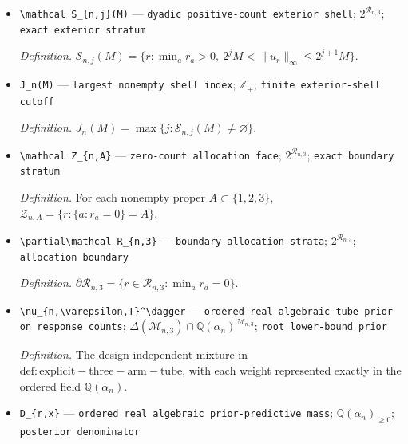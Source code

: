 \documentclass{article}
\begin{document}
\begin{itemize}
  \par\smallskip\noindent\emph{Definition.} \(\mathcal F_n(M)=\{r\in\mathcal R_{n,3}:\|u_r\|_\infty\le M\}\).
  \item \texttt{\textbackslash{}\allowbreak{}mathcal S\_\allowbreak{}\{n,\allowbreak{}j\}\allowbreak{}(M)} --- \texttt{dyadic positive-\allowbreak{}count exterior shell}; \(2^{\mathcal R_{n,3}}\); \texttt{exact exterior stratum}
  \par\smallskip\noindent\emph{Definition.} \(\mathcal S_{n,j}(M)=\{r:\min_ar_a>0,\ 2^jM<\|u_r\|_\infty\le2^{j+1}M\}\).
  \item \texttt{J\_\allowbreak{}n(M)} --- \texttt{largest nonempty shell index}; \(\mathbb Z_+\); \texttt{finite exterior-\allowbreak{}shell cutoff}
  \par\smallskip\noindent\emph{Definition.} \(J_n(M)=\max\{j:\mathcal S_{n,j}(M)\ne\varnothing\}\).
  \item \texttt{\textbackslash{}\allowbreak{}mathcal Z\_\allowbreak{}\{n,\allowbreak{}A\}\allowbreak{}} --- \texttt{zero-\allowbreak{}count allocation face}; \(2^{\mathcal R_{n,3}}\); \texttt{exact boundary stratum}
  \par\smallskip\noindent\emph{Definition.} For each nonempty proper \(A\subset\{1,2,3\}\), \(\mathcal Z_{n,A}=\{r:\{a:r_a=0\}=A\}\).
  \item \texttt{\textbackslash{}\allowbreak{}partial\textbackslash{}\allowbreak{}mathcal R\_\allowbreak{}\{n,\allowbreak{}3\}\allowbreak{}} --- \texttt{boundary allocation strata}; \(2^{\mathcal R_{n,3}}\); \texttt{allocation boundary}
  \par\smallskip\noindent\emph{Definition.} \(\partial\mathcal R_{n,3}=\{r\in\mathcal R_{n,3}:\min_a r_a=0\}\).
  \item \texttt{\textbackslash{}\allowbreak{}nu\_\allowbreak{}\{n,\allowbreak{}\textbackslash{}\allowbreak{}varepsilon,\allowbreak{}T\}\allowbreak{}\textasciicircum{}\textbackslash{}\allowbreak{}dagger} --- \texttt{ordered real algebraic tube prior on response counts}; \(\Delta(\mathcal M_{n,3})\cap\mathbb Q(\alpha_n)^{\mathcal M_{n,3}}\); \texttt{root lower-\allowbreak{}bound prior}
  \par\smallskip\noindent\emph{Definition.} The design-independent mixture in \(\mathrm{def:explicit-three-arm-tube}\), with each weight represented exactly in the ordered field \(\mathbb Q(\alpha_n)\).
  \item \texttt{D\_\allowbreak{}\{r,\allowbreak{}x\}\allowbreak{}} --- \texttt{ordered real algebraic prior-\allowbreak{}predictive mass}; \(\mathbb Q(\alpha_n)_{\ge0}\); \texttt{posterior denominator}

\end{itemize}
\end{document}
